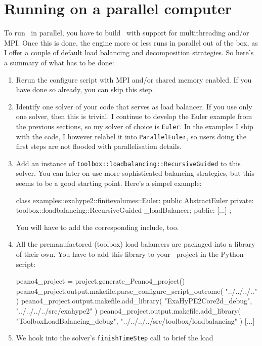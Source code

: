 \section{Running on a parallel computer}

To run \ExaHyPE\ in parallel, you have to build \Peano\ with support for
multithreading and/or MPI.
Once this is done, the engine more or less runs in parallel out of the box, as I
offer a couple of default load balancing and decomposition strategies. 
So here's a summary of what has to be done:



\begin{enumerate}
  \item Rerun the configure script with MPI and/or shared memory enabled. If you
  have done so already, you can skip this step.
  \item Identify one solver of your code that serves as load balancer. If you
  use only one solver, then this is trivial. I continue to develop the Euler
  example from the previous sections, so my solver of choice is \texttt{Euler}.
  In the examples I ship with the code, I however relabel it into
  \texttt{ParallelEuler}, so users doing the first steps are not flooded with
  parallelisation details.
  \item Add an instance of \texttt{toolbox::loadbalancing::RecursiveGuided} to
  this solver. You can later on use more sophisticated balancing strategies, but
  this seems to be a good starting point. Here's a simpel example:
  \begin{code}
class examples::exahype2::finitevolumes::Euler: public AbstractEuler {
  private:
    toolbox::loadbalancing::RecursiveGuided  _loadBalancer;
  public:
    [...]
};
  \end{code}
    You will have to add the corresponding include, too.
  \item All the premanufactored (toolbox) load balancers are packaged into a
  library of their own. You have to add this library to your \Peano\ project in
  the Python script:
  \begin{code}
peano4_project = project.generate_Peano4_project()
peano4_project.output.makefile.parse_configure_script_outcome( "../../../.." )
peano4_project.output.makefile.add_library( "ExaHyPE2Core2d_debug", "../../../../src/exahype2" )
peano4_project.output.makefile.add_library( 
  "ToolboxLoadBalancing_debug", "../../../../src/toolbox/loadbalancing" )
[...]
  \end{code}
  \item We hook into the solver's \texttt{finishTimeStep} call to brief the load

\end{enumerate}
